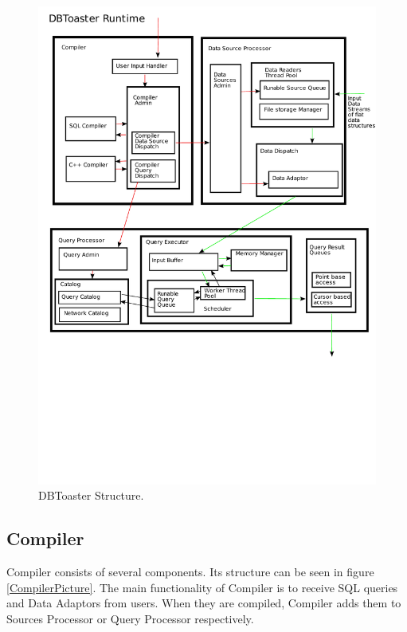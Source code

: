 \documentclass[14pt]{article}
\begin{document}

\begin{figure}
  \includegraphics[width=4.50in]{../figures/DBToasterRuntime.pdf}
  \caption{DBToaster Structure.}
  \label{DBToasterPic}
\end{figure}



\subsection{Compiler}

Compiler consists of several components. Its structure can be seen in figure \ref{CompilerPicture}. The main functionality of Compiler is to receive SQL queries and Data Adaptors from users. When they are compiled, Compiler adds them to Sources Processor or Query Processor respectively.
\end{document}
